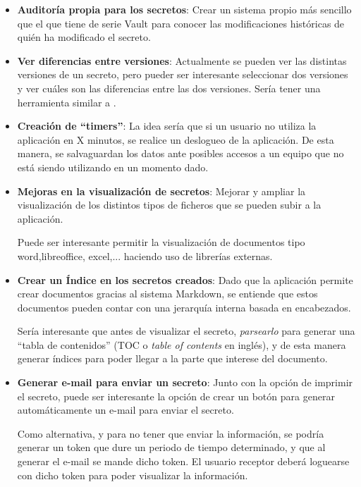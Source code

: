 \documentclass{\ClassPath/viu-tfm-template}
\begin{document}
\begin{itemize}
    \item \textbf{Auditoría propia para los secretos}: Crear un sistema propio más sencillo que el que tiene de serie Vault para conocer las modificaciones históricas de quién ha modificado el secreto.

    \item \textbf{Ver diferencias entre versiones}: Actualmente se pueden ver las distintas versiones de un secreto, pero pueder ser interesante seleccionar dos versiones y ver cuáles son las diferencias entre las dos versiones. Sería tener una herramienta similar a .

    \item \textbf{Creación de “timers”}: La idea sería que si un usuario no utiliza la aplicación en X minutos, se realice un deslogueo de la aplicación. De esta manera, se salvaguardan los datos ante posibles accesos a un equipo que no está siendo utilizando en un momento dado.

    \item \textbf{Mejoras en la visualización de secretos}: Mejorar y ampliar la visualización de los distintos tipos de ficheros que se pueden subir a la aplicación.

    Puede ser interesante permitir la visualización de documentos tipo word,libreoffice, excel,... haciendo uso de librerías externas.

    \item \textbf{Crear un Índice en los secretos creados}: Dado que la aplicación permite crear documentos gracias al sistema Markdown, se entiende que estos documentos pueden contar con una jerarquía interna basada en encabezados.

    Sería interesante que antes de visualizar el secreto, \textit{parsearlo} para generar una “tabla de contenidos” (TOC o \textit{table of contents} en inglés), y de esta manera generar índices para poder llegar a la parte que interese del documento.

    \item \textbf{Generar e-mail para enviar un secreto}: Junto con la opción de imprimir el secreto, puede ser interesante la opción de crear un botón para generar automáticamente un e-mail para enviar el secreto.

    Como alternativa, y para no tener que enviar la información, se podría generar un token que dure un periodo de tiempo determinado, y que al generar el e-mail se mande dicho token. El usuario receptor deberá loguearse con dicho token para poder visualizar la información.
\end{itemize}
\end{document}
